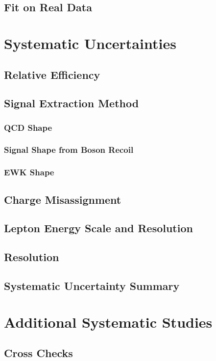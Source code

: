 \subsection{Fit on Real Data}

\section{Systematic Uncertainties}
\subsection{Relative Efficiency}
\subsection{Signal Extraction Method}
\subsubsection{QCD \ETm Shape}
\subsubsection{Signal \ETm Shape from Boson Recoil}
\subsubsection{EWK \ETm Shape}
\subsection{Charge Misassignment}
\subsection{Lepton Energy Scale and Resolution}
\subsection{\ETm Resolution}
\subsection{Systematic Uncertainty Summary}

\section{Additional Systematic Studies}
\subsection{Cross Checks}
